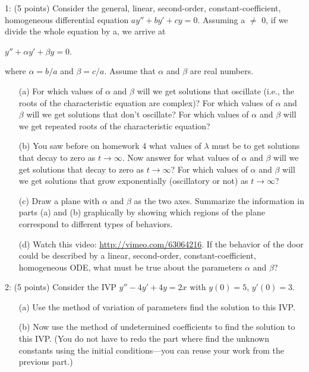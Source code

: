 \documentclass[12pt,letterpaper]{hmcpset}
\begin{document}
\begin{problem}
1: (5 points) Consider the general, linear, second-order, constant-coefficient, homogeneous differential
equation $ay'' + by' + cy = 0$. Assuming a $\neq$ 0, if we divide the whole equation by a,
we arrive at

\begin{center}
    $y'' + \alpha y' + \beta y = 0.$
\end{center}
where $\alpha = b/a$ and $\beta = c/a$. Assume that $\alpha$ and $\beta$ are real numbers.

\begin{enumerate}
    \item[(a)] For which values of $\alpha$ and $\beta$ will we get solutions that oscillate (i.e., the roots of the
characteristic equation are complex)? For which values of $\alpha$ and $\beta$ will we get solutions
that don’t oscillate? For which values of $\alpha$ and $\beta$ will we get repeated roots of the
characteristic equation?
    \item[(b)] You saw before on homework 4 what values of $\lambda$ must be to get solutions that decay
to zero as $t \rightarrow \infty$. Now answer for what values of $\alpha$ and $\beta$ will we get solutions that
decay to zero as $t \rightarrow \infty$? For which values of $\alpha$ and $\beta$ will we get solutions that grow
exponentially (oscillatory or not) as $t \rightarrow \infty$?
    \item[(c)] Draw a plane with $\alpha$ and $\beta$ as the two axes. Summarize the information in parts (a)
and (b) graphically by showing which regions of the plane correspond to different types
of behaviors.
    \item[(d)] Watch this video: 
    \url{http://vimeo.com/63064216}. 
    If the behavior of the door could be
described by a linear, second-order, constant-coefficient, homogeneous ODE, what must
be true about the parameters $\alpha$ and $\beta$?
\end{enumerate}

\end{problem}
\newpage

\begin{problem}
2: (5 points) Consider the IVP $y'' - 4y' + 4y = 2x$ with $y(0) = 5$, $y'(0) = 3$.

\begin{enumerate}
    \item[(a)] Use the method of variation of parameters find the solution to this IVP.
    \item[(b)] Now use the method of undetermined coefficients to find the solution to this IVP.
(You do not have to redo the part where find the unknown constants using the initial
conditions—you can reuse your work from the previous part.)
\end{enumerate}
\end{problem}
\newpage
\end{document}
